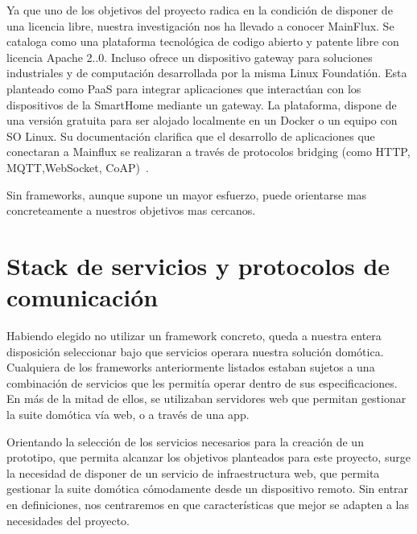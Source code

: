 Ya que uno de los objetivos del proyecto radica en la condición de disponer de una licencia libre, nuestra investigación nos ha llevado a conocer MainFlux. Se cataloga como una plataforma tecnológica de codigo abierto y patente libre con licencia Apache 2..0. Incluso ofrece un dispositivo gateway para soluciones industriales y de computación desarrollada por la misma Linux Foundatión. Esta planteado como PaaS para integrar aplicaciones que interactúan con los dispositivos de la SmartHome mediante un gateway. La plataforma, dispone de una versión gratuita para ser alojado localmente en un Docker o un equipo con SO Linux. Su documentación clarifica que el desarrollo de aplicaciones que conectaran a Mainflux se realizaran a través de protocolos bridging (como HTTP, MQTT,WebSocket, CoAP)~\cite{mainfluxdoc}.



Sin frameworks, aunque supone un mayor esfuerzo, puede orientarse mas concreteamente a nuestros objetivos mas cercanos.

\section{Stack de servicios y protocolos de comunicación}
\label{ch:Capitulo2.2}

Habiendo elegido no utilizar un framework concreto, queda a nuestra entera disposición seleccionar bajo que servicios operara nuestra solución domótica. Cualquiera de los frameworks anteriormente listados estaban sujetos a una combinación de servicios que les permitía operar dentro de sus especificaciones. En más de la mitad de ellos, se utilizaban servidores web que permitan gestionar la suite domótica vía web, o a través de una app.

Orientando la selección de los servicios necesarios para la creación de un prototipo, que permita alcanzar los objetivos planteados para este proyecto, surge la necesidad de disponer de un servicio de infraestructura web, que permita gestionar la suite domótica cómodamente desde un dispositivo remoto. Sin entrar en definiciones, nos centraremos en que características que mejor se adapten a las necesidades del proyecto.

